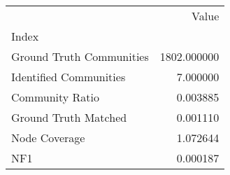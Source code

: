 \begin{tabular}{lr}
\toprule
{} &        Value \\
Index                    &              \\
\midrule
Ground Truth Communities &  1802.000000 \\
Identified Communities   &     7.000000 \\
Community Ratio          &     0.003885 \\
Ground Truth Matched     &     0.001110 \\
Node Coverage            &     1.072644 \\
NF1                      &     0.000187 \\
\bottomrule
\end{tabular}
